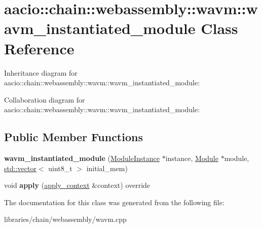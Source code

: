 \hypertarget{classaacio_1_1chain_1_1webassembly_1_1wavm_1_1wavm__instantiated__module}{}\section{aacio\+:\+:chain\+:\+:webassembly\+:\+:wavm\+:\+:wavm\+\_\+instantiated\+\_\+module Class Reference}
\label{classaacio_1_1chain_1_1webassembly_1_1wavm_1_1wavm__instantiated__module}


Inheritance diagram for aacio\+:\+:chain\+:\+:webassembly\+:\+:wavm\+:\+:wavm\+\_\+instantiated\+\_\+module\+:


Collaboration diagram for aacio\+:\+:chain\+:\+:webassembly\+:\+:wavm\+:\+:wavm\+\_\+instantiated\+\_\+module\+:
\subsection*{Public Member Functions}
\begin{DoxyCompactItemize}
\item 
\mbox{\label{classaacio_1_1chain_1_1webassembly_1_1wavm_1_1wavm__instantiated__module_a6683c5ac78869b75ade6911402b5c17c}} 
{\bfseries wavm\+\_\+instantiated\+\_\+module} (\mbox{\hyperlink{struct_runtime_1_1_module_instance}{Module\+Instance}} $\ast$instance, \mbox{\hyperlink{struct_i_r_1_1_module}{Module}} $\ast$module, \mbox{\hyperlink{classstd_1_1vector}{std\+::vector}}$<$ uint8\+\_\+t $>$ initial\+\_\+mem)
\item 
\mbox{\label{classaacio_1_1chain_1_1webassembly_1_1wavm_1_1wavm__instantiated__module_a716794d10f82be578e09a0ced2ed708e}} 
void {\bfseries apply} (\mbox{\hyperlink{classaacio_1_1chain_1_1apply__context}{apply\+\_\+context}} \&context) override
\end{DoxyCompactItemize}


The documentation for this class was generated from the following file\+:\begin{DoxyCompactItemize}
\item 
libraries/chain/webassembly/wavm.\+cpp\end{DoxyCompactItemize}
